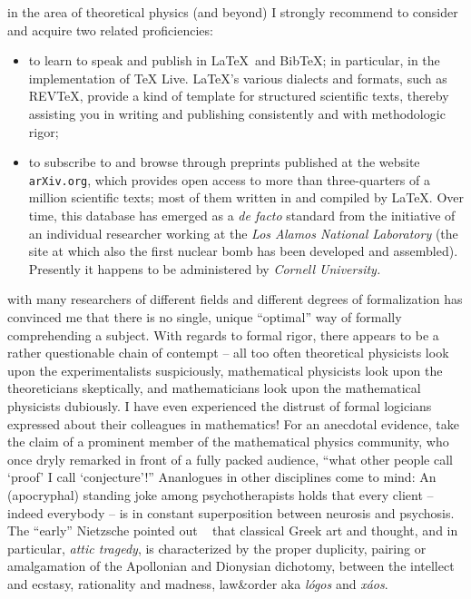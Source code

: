  in the area of theoretical physics (and beyond)
I strongly recommend to consider and acquire two related proficiencies:
\begin{itemize}
\item
to learn to speak and publish in \LaTeX\ and BibTeX;
in particular, in the implementation of TeX Live.
\LaTeX's various dialects and formats,
such as {REVTeX}, provide a kind of template for structured scientific texts,
thereby assisting you in writing and publishing consistently and with methodologic rigor;
\item
to subscribe to and browse through preprints published at the website {\tt arXiv.org},
which provides open access to more than three-quarters of a million scientific texts;
most of them written in and compiled by \LaTeX.
Over time, this database has emerged as a {\it de facto} standard
from the initiative of an individual researcher working at the
{\em Los Alamos National Laboratory}
(the site at which also the first nuclear bomb has been developed and assembled).
Presently it happens to be administered by {\em Cornell University.}
\end{itemize}

 with many researchers of different fields and different degrees of formalization
has convinced me that there is no single, unique ``optimal'' way of formally comprehending a subject\cite{anderson:73}.
With regards to formal rigor, there appears to be a rather questionable chain of contempt --
all too often
theoretical physicists look upon the experimentalists suspiciously,
mathematical physicists look upon the theoreticians skeptically,
and
mathematicians look upon the mathematical physicists dubiously.
I have even experienced the distrust of formal logicians expressed about their colleagues in mathematics!
For an anecdotal evidence, take the claim of a prominent member of the mathematical physics community,
who once dryly remarked in front of a fully packed audience,
``what other people call `proof' I call `conjecture'!''
Ananlogues in other disciplines come to mind:
An (apocryphal) standing joke among psychotherapists holds that every client -- indeed everybody -- is in constant superposition between
neurosis and psychosis.
The ``early'' Nietzsche pointed out ~\cite{Nietzsche-GeburtTragoedie} that classical Greek art and thought,
and in particular, {\em attic tragedy}, is characterized by the proper duplicity, pairing or amalgamation of the
Apollonian and Dionysian dichotomy, between the intellect and ecstasy, rationality and madness, law{\&}order aka
{\it l\'ogos} and {\it x\'aos}.

